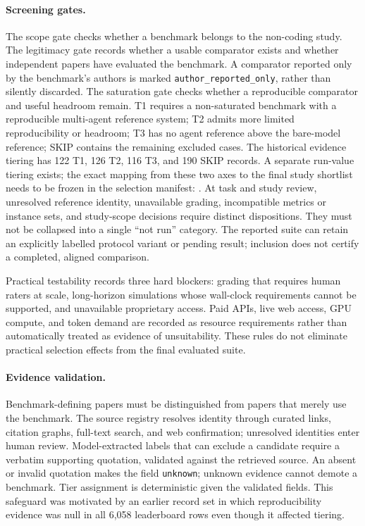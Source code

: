\paragraph{Screening gates.}
The scope gate checks whether a benchmark belongs to the non-coding study. The legitimacy gate
records whether a usable comparator exists and whether independent papers have evaluated the
benchmark. A comparator reported only by the benchmark's authors is marked
\texttt{author\_reported\_only}, rather than silently discarded. The saturation gate checks
whether a reproducible comparator and useful headroom remain. T1 requires a non-saturated
benchmark with a reproducible multi-agent reference system; T2 admits more limited
reproducibility or headroom; T3 has no agent reference above the bare-model reference; SKIP
contains the remaining excluded cases. The historical evidence tiering has 122 T1, 126 T2,
116 T3, and 190 SKIP records. A separate run-value tiering exists; the exact mapping from these
two axes to the final study shortlist needs to be frozen in the selection manifest:
.
At task and study review, unresolved reference identity, unavailable grading, incompatible
metrics or instance sets, and study-scope decisions require distinct dispositions. They must
not be collapsed into a single ``not run'' category. The reported suite can retain an explicitly
labelled protocol variant or pending result; inclusion does not certify a completed, aligned
comparison.

Practical testability records three hard blockers: grading that requires human raters at scale,
long-horizon simulations whose wall-clock requirements cannot be supported, and unavailable
proprietary access. Paid APIs, live web access, GPU compute, and token demand are recorded as
resource requirements rather than automatically treated as evidence of unsuitability. These
rules do not eliminate practical selection effects from the final evaluated suite.

\paragraph{Evidence validation.}
Benchmark-defining papers must be distinguished from papers that merely use the benchmark.
The source registry resolves identity through curated links, citation graphs, full-text search,
and web confirmation; unresolved identities enter human review. Model-extracted labels that can
exclude a candidate require a verbatim supporting quotation, validated against the retrieved
source. An absent or invalid quotation makes the field \texttt{unknown}; unknown evidence cannot
demote a benchmark. Tier assignment is deterministic given the validated fields. This safeguard
was motivated by an earlier record set in which reproducibility evidence was null in all 6{,}058
leaderboard rows even though it affected tiering.


